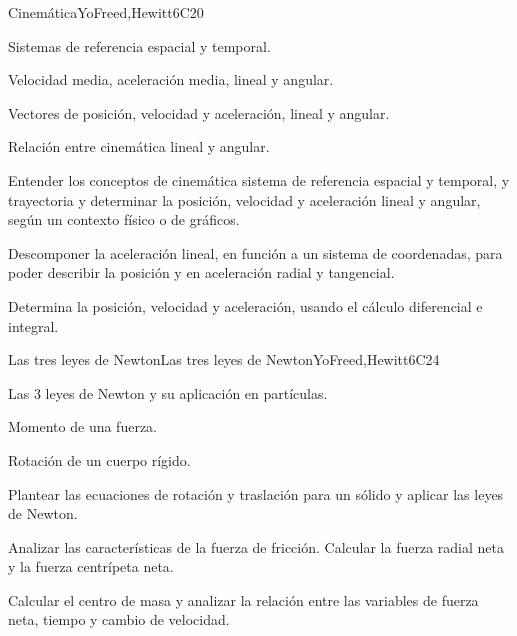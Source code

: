 \begin{syllabus}
\begin{unit}{}{Cinemática}{YoFreed,Hewitt}{6}{C20}
   \begin{topics}
      \item Sistemas de referencia espacial y temporal.
      \item Velocidad media, aceleración media, lineal y angular.
      \item Vectores de posición, velocidad y aceleración, lineal y angular.
      \item Relación entre cinemática lineal y angular.
      \end{topics}
   \begin{learningoutcomes}
      \item Entender los conceptos de cinemática sistema de referencia espacial y temporal, y trayectoria y determinar la posición, velocidad y aceleración lineal y angular, según un contexto físico o de gráficos.
      \item Descomponer la aceleración lineal, en función a un sistema de coordenadas, para poder describir la posición y en aceleración radial y tangencial.
      \item Determina la posición, velocidad y aceleración, usando el cálculo diferencial e integral. 
   \end{learningoutcomes}
\end{unit}  

\begin{unit}{Las tres leyes de Newton}{Las tres leyes de Newton}{YoFreed,Hewitt}{6}{C24}
   \begin{topics}
      \item Las 3 leyes de Newton y su aplicación en partículas.
      \item Momento de una fuerza.
      \item Rotación de un cuerpo rígido.
   \end{topics}

   \begin{learningoutcomes}
      \item Plantear las ecuaciones de rotación y traslación para un sólido y aplicar las leyes de Newton. 
      \item Analizar las características de la fuerza de fricción. Calcular la fuerza radial neta y la fuerza centrípeta neta.
      \item Calcular el centro de masa y analizar la relación entre las variables de fuerza neta, tiempo y cambio de velocidad. 
   \end{learningoutcomes}
\end{unit}

\begin{coursebibliography}
\end{coursebibliography}

\end{syllabus}
